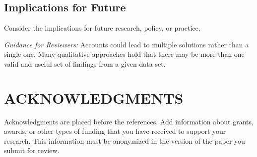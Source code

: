 \documentclass[acmsmall]{acmart}
\begin{document}
\subsection{Implications for Future}
Consider the implications for future research, policy, or practice.

\vspace{3mm}
\textit{Guidance for Reviewers:} Accounts could lead to multiple solutions rather than a single one. Many qualitative approaches hold that there may be more than one valid and useful set of findings from a given data set.

\section{ACKNOWLEDGMENTS}
Acknowledgments are placed before the references. Add information about grants, awards, or other types of funding that you have received to support your research. This information must be anonymized in the version of the paper you submit for review.  




\appendix
\end{document}
